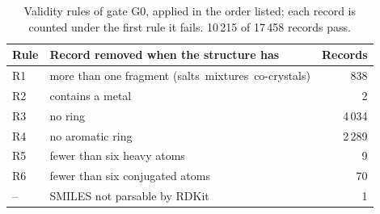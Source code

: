 \begin{table}[h]
\centering
\caption{Validity rules of gate G0, applied in the order listed; each record is counted under the first rule it fails.
10\,215 of 17\,458 records pass.}
\label{tab:si-validity}
\begin{tabular}{llr}
\toprule
Rule & Record removed when the structure has & Records\\
\midrule
R1 & more than one fragment (salts\, mixtures\, co-crystals) & 838 \\
R2 & contains a metal & 2 \\
R3 & no ring & 4\,034 \\
R4 & no aromatic ring & 2\,289 \\
R5 & fewer than six heavy atoms & 9 \\
R6 & fewer than six conjugated atoms & 70 \\
-- & SMILES not parsable by RDKit & 1 \\
\bottomrule
\end{tabular}
\end{table}
